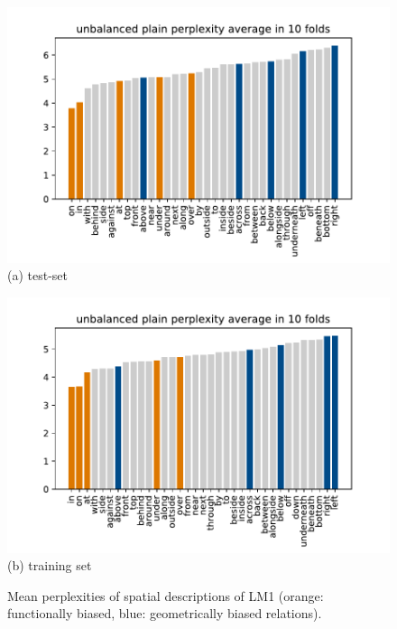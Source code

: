 \begin{figure}[ht]
  \begin{center}
      \begin{minipage}{0.5\linewidth}
      	\centering
      	\hspace*{-1.2em}\includegraphics[width=1.12\linewidth]{studies/splu2018/figures/o_pp_cv-avg.pdf}\\
	  	(a) test-set 
    \end{minipage}%
	\begin{minipage}{0.5\linewidth}
		\centering
		\hspace*{-1.em}\includegraphics[width=1.12\linewidth]{studies/splu2018/figures/o_train_pp_cv-avg.pdf}\\
		(b) training set
    \end{minipage}%
  \caption{Mean perplexities of spatial descriptions of LM1 (orange:
    functionally biased, blue: geometrically biased relations).}
  \label{splu2018:fig:fig-plain-original}
\end{center}
\end{figure}


